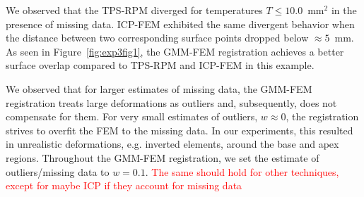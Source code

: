 \documentclass[journal]{IEEEtran}
\newcommand{\comment}[1]{\textcolor{red}{#1}}
\begin{document}
We observed that the TPS-RPM diverged for temperatures $T\leq10.0$~$\mathrm{mm}^2$ in the presence of missing data. ICP-FEM exhibited the same divergent behavior when the distance between two corresponding surface points dropped below $\approx5$~mm. As seen in Figure~\ref{fig:exp3fig1}, the GMM-FEM registration achieves a better surface overlap compared to TPS-RPM and ICP-FEM in this example.

We observed that for larger estimates of missing data, the GMM-FEM registration treats large deformations as outliers and, subsequently, does not compensate for them. For very small estimates of outliers, $w\approx0$, the registration strives to overfit the FEM to the missing data. In our experiments, this resulted in unrealistic deformations, e.g. inverted elements, around the base and apex regions. Throughout the GMM-FEM registration, we set the estimate of outliers/missing data to $w=0.1$. \comment{The same should hold for other techniques, except for maybe ICP if they account for missing data}
\end{document}
